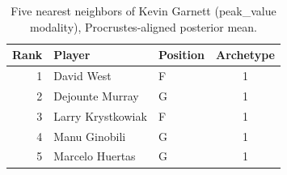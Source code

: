 \begin{table}[htbp]
  \centering\small
  \begin{tabular}{rllc}
    \toprule
    Rank & Player & Position & Archetype \\
    \midrule
    1 & David West & F & 1 \\
    2 & Dejounte Murray & G & 1 \\
    3 & Larry Krystkowiak & F & 1 \\
    4 & Manu Ginobili & G & 1 \\
    5 & Marcelo Huertas & G & 1 \\
    \bottomrule
  \end{tabular}
  \caption{Five nearest neighbors of Kevin Garnett (peak_value modality), Procrustes-aligned posterior mean.}
  \label{tab:Kevin_Garnett_neighbors_peak_value}
\end{table}

